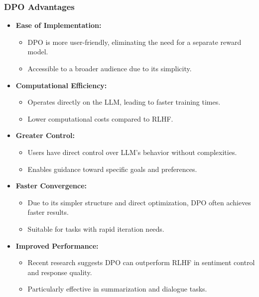 \begin{frame}[fragile]\frametitle{DPO Advantages}
  \begin{itemize}
    \item \textbf{Ease of Implementation:}
      \begin{itemize}
        \item DPO is more user-friendly, eliminating the need for a separate reward model.
        \item Accessible to a broader audience due to its simplicity.
      \end{itemize}
    \item \textbf{Computational Efficiency:}
      \begin{itemize}
        \item Operates directly on the LLM, leading to faster training times.
        \item Lower computational costs compared to RLHF.
      \end{itemize}
    \item \textbf{Greater Control:}
      \begin{itemize}
        \item Users have direct control over LLM's behavior without complexities.
        \item Enables guidance toward specific goals and preferences.
      \end{itemize}
    \item \textbf{Faster Convergence:}
      \begin{itemize}
        \item Due to its simpler structure and direct optimization, DPO often achieves faster results.
        \item Suitable for tasks with rapid iteration needs.
      \end{itemize}
    \item \textbf{Improved Performance:}
      \begin{itemize}
        \item Recent research suggests DPO can outperform RLHF in sentiment control and response quality.
        \item Particularly effective in summarization and dialogue tasks.
      \end{itemize}
  \end{itemize}
\end{frame}

